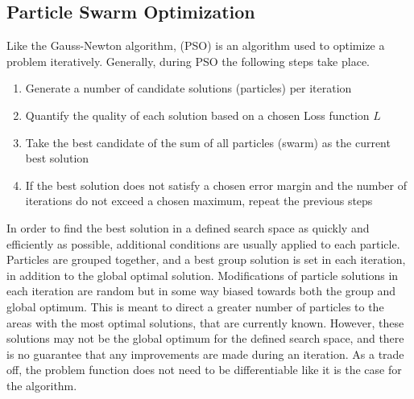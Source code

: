 
\subsection{Particle Swarm Optimization}
\label{sec:PSO}
Like the Gauss-Newton algorithm,  (PSO) is an algorithm used to optimize a problem iteratively\cite{akman2018parameter}.
Generally, during PSO the following steps take place.

\begin{enumerate}
	\item Generate a number of candidate solutions (particles) per iteration
	\item Quantify the quality of each solution based on a chosen Loss function $L$
	\item Take the best candidate of the sum of all particles (swarm) as the current best solution
	\item If the best solution does not satisfy a chosen error margin and the number of iterations do not exceed a chosen
		maximum, repeat the previous steps
\end{enumerate}


In order to find the best solution in a defined search space as quickly and efficiently as possible, additional conditions are usually applied
to each particle. Particles are grouped together, and a best group solution is set in each iteration, in addition to the global optimal solution.
Modifications of particle solutions in each iteration are random but in some way biased towards both the group and global optimum.
This is meant to direct a greater number of particles to the areas with the most optimal solutions, that are currently known.
However, these solutions may not be the global optimum for the defined search space, and there is no guarantee that any improvements are made during
an iteration. As a trade off, the problem function does not need to be differentiable like it is the case for the  algorithm. \newline


